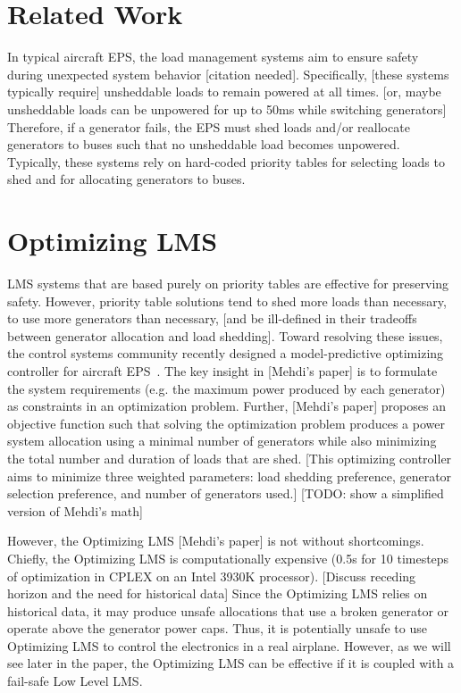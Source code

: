 \documentclass{acm_proc_article-sp}
\begin{document}
\section{Related Work}
\label{sec:related-work}
In typical aircraft EPS, the load management systems aim to ensure safety during unexpected system behavior [citation needed].
Specifically, [these systems typically require] unsheddable loads to remain powered at all times. [or, maybe unsheddable loads can be unpowered for up to 50ms while switching generators]
Therefore, if a generator fails, the EPS must shed loads and/or reallocate generators to buses such that no unsheddable load becomes unpowered.
Typically, these systems rely on hard-coded priority tables for selecting loads to shed and for allocating generators to buses.

\section{Optimizing LMS}
\label{sec:optimizing-LMS}
LMS systems that are based purely on priority tables are effective for preserving safety.
However, priority table solutions tend to shed more loads than necessary, to use more generators than necessary, [and be ill-defined in their tradeoffs between generator allocation and load shedding].
Toward resolving these issues, the control systems community recently designed a model-predictive optimizing controller for aircraft EPS~\cite{mehdi}.
The key insight in [Mehdi's paper] is to formulate the system requirements (e.g. the maximum power produced by each generator) as constraints in an optimization problem.
Further, [Mehdi's paper] proposes an objective function such that solving the optimization problem produces a power system allocation using a minimal number of generators while also minimizing the total number and duration of loads that are shed. 
[This optimizing controller aims to minimize three weighted parameters: load shedding preference, generator selection preference, and number of generators used.]
[TODO: show a simplified version of Mehdi's math]

However, the Optimizing LMS [Mehdi's paper] is not without shortcomings.
Chiefly, the Optimizing LMS is computationally expensive (0.5s for 10 timesteps of optimization in CPLEX on an Intel 3930K processor).
[Discuss receding horizon and the need for historical data]
Since the Optimizing LMS relies on historical data, it may produce unsafe allocations that use a broken generator or operate above the generator power caps.
Thus, it is potentially unsafe to use Optimizing LMS to control the electronics in a real airplane. 
However, as we will see later in the paper, the Optimizing LMS can be effective if it is coupled with a fail-safe Low Level LMS.
\end{document}
